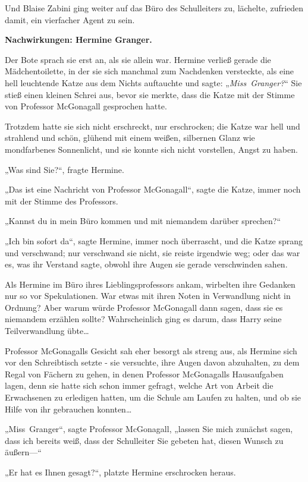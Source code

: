 {Und Blaise Zabini ging weiter auf das Büro des Schulleiters zu, lächelte, zufrieden damit, ein vierfacher Agent zu sein.

\textbf{Nachwirkungen: Hermine Granger.}

Der Bote sprach sie erst an, als sie allein war. Hermine verließ gerade die Mädchentoilette, in der sie sich manchmal zum Nachdenken versteckte, als eine hell leuchtende Katze aus dem Nichts auftauchte und sagte: „\emph{Miss~Granger?}“ Sie stieß einen kleinen Schrei aus, bevor sie merkte, dass die Katze mit der Stimme von Professor McGonagall gesprochen hatte.

Trotzdem hatte sie sich nicht erschreckt, nur erschrocken; die Katze war hell und strahlend und schön, glühend mit einem weißen, silbernen Glanz wie mondfarbenes Sonnenlicht, und sie konnte sich nicht vorstellen, Angst zu haben.

„Was sind Sie?“, fragte Hermine.

„Das ist eine Nachricht von Professor McGonagall“, sagte die Katze, immer noch mit der Stimme des Professors.

„Kannst du in mein Büro kommen und mit niemandem darüber sprechen?“

„Ich bin sofort da“, sagte Hermine, immer noch überrascht, und die Katze sprang und verschwand; nur verschwand sie nicht, sie reiste irgendwie weg; oder das war es, was ihr Verstand sagte, obwohl ihre Augen sie gerade verschwinden sahen.

Als Hermine im Büro ihres Lieblingsprofessors ankam, wirbelten ihre Gedanken nur so vor Spekulationen. War etwas mit ihren Noten in Verwandlung nicht in Ordnung? Aber warum würde Professor McGonagall dann sagen, dass sie es niemandem erzählen sollte? Wahrscheinlich ging es darum, dass Harry seine Teilverwandlung übte…

Professor McGonagalls Gesicht sah eher besorgt als streng aus, als Hermine sich vor den Schreibtisch setzte - sie versuchte, ihre Augen davon abzuhalten, zu dem Regal von Fächern zu gehen, in denen Professor McGonagalls Hausaufgaben lagen, denn sie hatte sich schon immer gefragt, welche Art von Arbeit die Erwachsenen zu erledigen hatten, um die Schule am Laufen zu halten, und ob sie Hilfe von ihr gebrauchen konnten…

„Miss~Granger“, sagte Professor McGonagall, „lassen Sie mich zunächst sagen, dass ich bereits weiß, dass der Schulleiter Sie gebeten hat, diesen Wunsch zu äußern—“

„Er hat es Ihnen gesagt?“, platzte Hermine erschrocken heraus.

}
